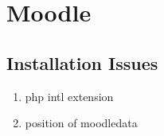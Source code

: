 \newpage
\section{Moodle}
    \subsection{Installation Issues}
        \begin{enumerate}
            \item php intl extension 
            \item position of moodledata
        \end{enumerate}
